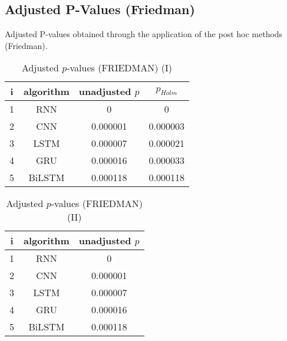 \documentclass[a4paper,10pt]{article}
\begin{document}
\begin{landscape}
\section{Adjusted P-Values (Friedman)}


Adjusted P-values obtained through the application of the post hoc methods (Friedman).

\begin{table}[!htp]
\centering\small
\begin{tabular}{cccc}
i&algorithm&unadjusted $p$&$p_{Holm}$\\
\hline1&RNN&0&0\\2&CNN&0.000001&0.000003\\3&LSTM&0.000007&0.000021\\4&GRU&0.000016&0.000033\\5&BiLSTM&0.000118&0.000118\\\hline
\end{tabular}
\caption{Adjusted $p$-values (FRIEDMAN) (I)}
\end{table}
\begin{table}[!htp]
\centering\small
\begin{tabular}{ccc}
i&algorithm&unadjusted $p$\\
\hline1&RNN&0\\2&CNN&0.000001\\3&LSTM&0.000007\\4&GRU&0.000016\\5&BiLSTM&0.000118\\\hline
\end{tabular}
\caption{Adjusted $p$-values (FRIEDMAN) (II)}
\end{table}

\newpage
\end{landscape}
\end{document}
